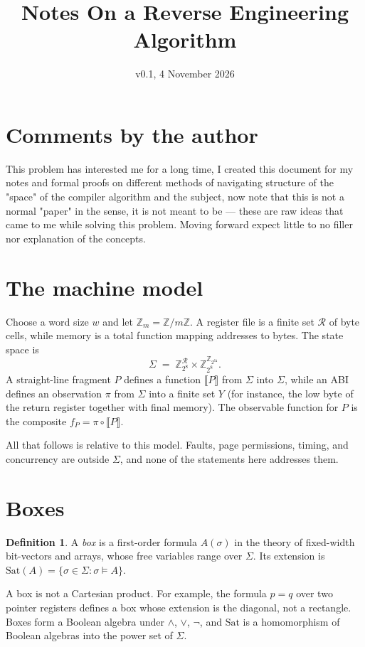\documentclass[11pt]{article}
\title{Notes On a Reverse Engineering Algorithm}
\author{}
\date{v0.1, 4 November 2026}
\theoremstyle{definition}
\newtheorem{definition}[theorem]{Definition}
\theoremstyle{remark}
\newcommand{\Z}{\mathbb{Z}}
\newcommand{\Sat}{\mathrm{Sat}}
\begin{document}
\maketitle

\section{Comments by the author}

This problem has interested me for a long time, I created this document for my notes and formal proofs on different methods of navigating structure of the "space" of the compiler algorithm and the subject, now note that this is not a normal "paper" in the sense, it is not meant to be --- these are raw ideas that came to me while solving this problem. Moving forward expect little to no filler nor explanation of the concepts.

\section{The machine model}

Choose a word size $w$ and let $\Z_m = \Z/m\Z$. A register file is a finite set $\mathcal{R}$ of byte cells, while memory is a total function mapping addresses to bytes. The state space is
\[
  \Sigma \;=\; \Z_{2^8}^{\mathcal{R}} \times \Z_{2^8}^{\Z_{2^{64}}}.
\]
A straight-line fragment $P$ defines a function $\llbracket P \rrbracket$ from $\Sigma$ into $\Sigma$, while an ABI defines an observation $\pi$ from $\Sigma$ into a finite set $Y$ (for instance, the low byte of the return register together with final memory). The observable function for $P$ is the composite $f_P = \pi \circ \llbracket P \rrbracket$.

All that follows is relative to this model. Faults, page permissions, timing, and concurrency are outside $\Sigma$, and none of the statements here addresses them.

\section{Boxes}

\begin{definition}
A \emph{box} is a first-order formula $A(\sigma)$ in the theory of fixed-width bit-vectors and arrays, whose free variables range over $\Sigma$. Its extension is $\Sat(A) = \{\sigma \in \Sigma : \sigma \models A\}$.
\end{definition}

A box is not a Cartesian product. For example, the formula $p = q$ over two pointer registers defines a box whose extension is the diagonal, not a rectangle. Boxes form a Boolean algebra under $\wedge$, $\vee$, $\neg$, and $\Sat$ is a homomorphism of Boolean algebras into the power set of $\Sigma$.
\end{document}
